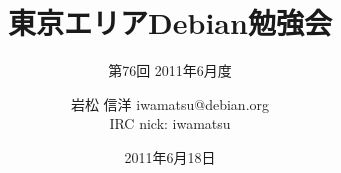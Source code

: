 




\documentclass[cjk,dvipdfmx,12pt]{beamer}
\usepackage{monthlypresentation}



\title{東京エリアDebian勉強会}
\subtitle{第76回 2011年6月度}
\author{岩松 信洋 iwamatsu@debian.org\\IRC nick: iwamatsu}
\date{2011年6月18日}



